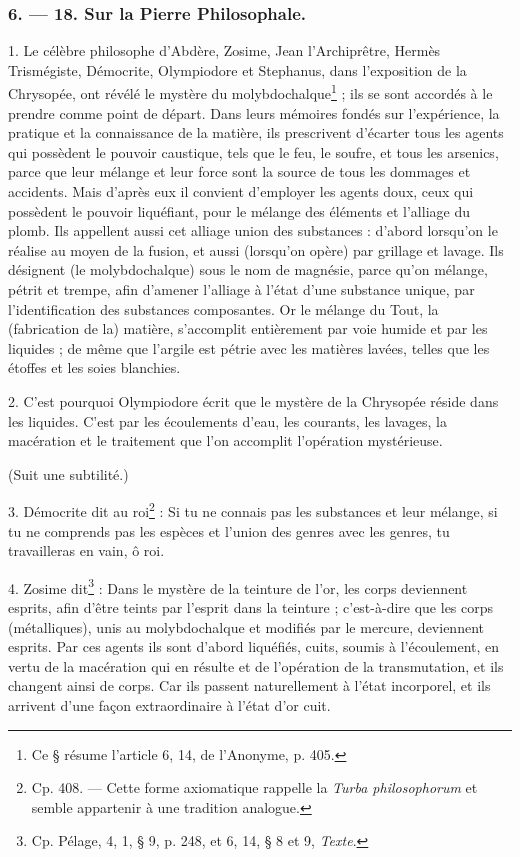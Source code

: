 \documentclass[a4paper, 11pt, oneside, polutonikogreek, french]{article}
\begin{document}
\subsubsection{6. --- 18. Sur la Pierre Philosophale.}

1. Le célèbre philosophe d'Abdère, Zosime, Jean l'Archiprêtre, Hermès Trismégiste, Démocrite, Olympiodore et Stephanus, dans l'exposition de la Chrysopée, ont révélé le mystère du molybdochalque\footnote{Ce § résume l'article 6, 14, de l'Anonyme, p. 405.} ; ils se sont accordés à le prendre comme point de départ. Dans leurs mémoires fondés sur l'expérience, la pratique et la connaissance de la matière, ils prescrivent d'écarter tous les agents qui possèdent le pouvoir caustique, tels que le feu, le soufre, et tous les arsenics, parce que leur mélange et leur force sont la source de tous les dommages et accidents. Mais d'après eux il convient d'employer les agents doux, ceux qui possèdent le pouvoir liquéfiant, pour le mélange des éléments et l'alliage du plomb. Ils appellent aussi cet alliage union des substances : d'abord lorsqu'on le réalise au moyen de la fusion, et aussi (lorsqu'on opère) par grillage et lavage. Ils désignent (le molybdochalque) sous le nom de magnésie, parce qu'on mélange, pétrit et trempe, afin d'amener l'alliage à l'état d'une substance unique, par l'identification des substances composantes. Or le mélange du Tout, la (fabrication de la) matière, s'accomplit entièrement par voie humide et par les liquides ; de même que l'argile est pétrie avec les matières lavées, telles que les étoffes et les soies blanchies.

2. C'est pourquoi Olympiodore écrit que le mystère de la Chrysopée réside dans les liquides. C'est par les écoulements d'eau, les courants, les lavages, la macération et le traitement que l'on accomplit l'opération mystérieuse.

(Suit une subtilité.)

3. Démocrite dit au roi\footnote{Cp. 408. --- Cette forme axiomatique rappelle la \emph{Turba philosophorum} et semble appartenir à une tradition analogue.} : Si tu ne connais pas les substances et leur mélange, si tu ne comprends pas les espèces et l'union des genres avec les genres, tu travailleras en vain, ô roi.

4. Zosime dit\footnote{Cp. Pélage, 4, 1, § 9, p. 248, et 6, 14, § 8 et 9, \emph{Texte}.} : Dans le mystère de la teinture de l'or, les corps deviennent esprits, afin d'être teints par l'esprit dans la teinture ; c'est-à-dire que les corps (métalliques), unis au molybdochalque et modifiés par le mercure, deviennent esprits. Par ces agents ils sont d'abord liquéfiés, cuits, soumis à l'écoulement, en vertu de la macération qui en résulte et de l'opération de la transmutation, et ils changent ainsi de corps. Car ils passent naturellement à l'état incorporel, et ils arrivent d'une façon extraordinaire à l'état d'or cuit.
\end{document}
